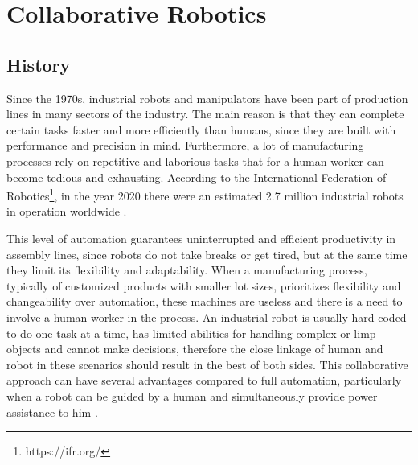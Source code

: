 \chapter{Collaborative Robotics}
\label{chapter:state-of-art}


\section{History}


\par Since the 1970s, industrial robots and manipulators have been part of production lines in many sectors of the industry. The main reason is that they can complete certain tasks faster and more efficiently than humans, since they are built with performance and precision in mind. Furthermore, a lot of manufacturing processes rely on repetitive and laborious tasks that for a human worker can become tedious and exhausting. According to the International Federation of Robotics\footnote{https://ifr.org/}, in the year 2020 there were an estimated 2.7 million industrial robots in operation worldwide \cite{wr.report.2020}.

\par This level of automation guarantees uninterrupted and efficient productivity in assembly lines, since robots do not take breaks or get tired, but at the same time they limit its flexibility and adaptability. When a manufacturing process, typically of customized products with smaller lot sizes, prioritizes flexibility and changeability over automation, these machines are useless and there is a need to involve a human worker in the process.
% 
An industrial robot is usually hard coded to do one task at a time, has limited abilities for handling complex or limp objects and cannot make decisions, therefore the close linkage of human and robot in these scenarios should result in the best of both sides. This collaborative approach can have several advantages compared to full automation, particularly when a robot can be guided by a human and simultaneously provide power assistance to him \cite{coop.assembly}.


